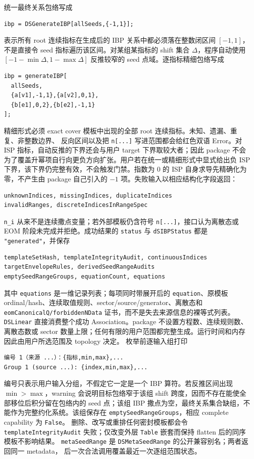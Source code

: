 ﻿\documentclass[a4paper,11pt]{article}
\begin{document}
统一最终关系包络写成
\begin{verbatim}
ibp = DSGenerateIBP[allSeeds,{-1,1}];
\end{verbatim}
表示所有 root 连续指标在生成后的 IBP 关系中都必须落在整数闭区间 $[-1,1]$，不是直接令
seed 指标遍历该区间。对某组某指标的 shift 集合 $\Delta$，程序自动使用
$[-1-\min\Delta,1-\max\Delta]$ 反推较窄的 seed 点域。逐指标精细包络写成
\begin{verbatim}
ibp = generateIBP[
  allSeeds,
  {a[v1],-1,1},{a[v2],0,1},
  {b[e1],0,2},{b[e2],-1,1}
];
\end{verbatim}
精细形式必须 exact cover 模板中出现的全部 root 连续指标。未知、遗漏、重复、非整数边界、
反向区间以及把 \texttt{n[...]} 写进范围都会给红色双语 Error。对 ISP 指标，自动反推的下界还会与用户 target 下界取较大者；因此 package 不会为了覆盖升幂项自行向更负方向扩张。用户若在统一或精细形式中显式给出负 ISP 下界，该下界仍完整有效，不会触发门禁。指数为 $0$ 的 ISP 自身求导先精确化为零，不产生由 package 自己引入的 $-1$ 项。失败输入以相应结构化字段返回：
\begin{verbatim}
unknownIndices, missingIndices, duplicateIndices
invalidRanges, discreteIndicesInRangeSpec
\end{verbatim}

\texttt{n\_i} 从来不是连续撒点变量；若外部模板仍含符号 \texttt{n[...]}，接口认为离散态或
EOM 阶段未完成并拒绝。成功结果的 \texttt{status} 与 \texttt{dSIBPStatus} 都是
\texttt{"generated"}，并保存
\begin{verbatim}
templateSetHash, templateIntegrityAudit, continuousIndices
targetEnvelopeRules, derivedSeedRangeAudits
emptySeedRangeGroups, equationCount, equations
\end{verbatim}
其中 \texttt{equations} 是一维记录列表；每项同时带展开后的 \texttt{equation}、原模板
ordinal/hash、连续取值规则、sector/source/generator、离散态和
\texttt{eomCanonicalQ/forbiddenNData} 证书，而不是失去来源信息的裸等式列表。
\texttt{DSLinear} 直接消费整个成功 Association。package 不设置方程数、连续规则数、离散态数或
sector 数量上限；任何有限的用户范围都完整生成。运行时间和内存因此由用户所选范围及 topology 决定。
枚举前逐输入组打印
\begin{verbatim}
编号 1（来源 ...）：{指标,min,max},...
Group 1 (source ...): {index,min,max},...
\end{verbatim}
编号只表示用户输入分组，不假定它一定是一个 IBP 算符。若反推区间出现 $\min>\max$，warning
会说明目标包络窄于该组 shift 跨度，因而不存在能使全部移位后积分留在包络内的 seed 点；该组
IBP 撒点为空，最终关系集合缺组，不能作为完整约化系统。该组保存在
\texttt{emptySeedRangeGroups}，相应 complete capability 为 \texttt{False}。
删除、改写或重排任何密封模板都会令 \texttt{templateIntegrityAudit} 失败；仅改变外层
\texttt{Table} 嵌套而保持 flatten 后的同序模板不影响结果。
\texttt{metaSeedRange} 是 \texttt{DSMetaSeedRange} 的公开兼容别名；两者返回同一 metadata，
后一次合法调用覆盖最近一次逐组范围状态。
\end{document}
